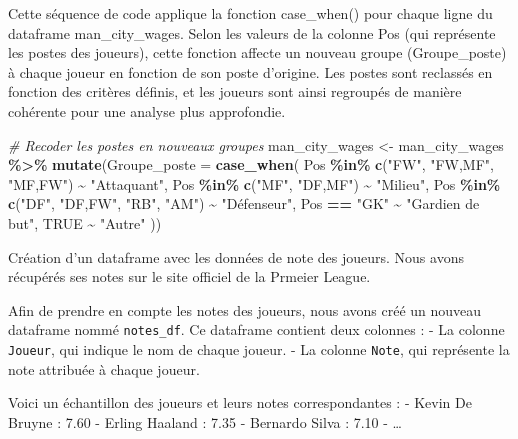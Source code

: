 \documentclass[
]{article}
\newenvironment{Shaded}{\begin{snugshade}}{\end{snugshade}}
\newcommand{\AttributeTok}[1]{\textcolor[rgb]{0.13,0.29,0.53}{#1}}
\newcommand{\CommentTok}[1]{\textcolor[rgb]{0.56,0.35,0.01}{\textit{#1}}}
\newcommand{\ConstantTok}[1]{\textcolor[rgb]{0.56,0.35,0.01}{#1}}
\newcommand{\FunctionTok}[1]{\textcolor[rgb]{0.13,0.29,0.53}{\textbf{#1}}}
\newcommand{\NormalTok}[1]{#1}
\newcommand{\OtherTok}[1]{\textcolor[rgb]{0.56,0.35,0.01}{#1}}
\newcommand{\SpecialCharTok}[1]{\textcolor[rgb]{0.81,0.36,0.00}{\textbf{#1}}}
\newcommand{\StringTok}[1]{\textcolor[rgb]{0.31,0.60,0.02}{#1}}
\begin{document}
Cette séquence de code applique la fonction case\_when() pour chaque
ligne du dataframe man\_city\_wages. Selon les valeurs de la colonne Pos
(qui représente les postes des joueurs), cette fonction affecte un
nouveau groupe (Groupe\_poste) à chaque joueur en fonction de son poste
d'origine. Les postes sont reclassés en fonction des critères définis,
et les joueurs sont ainsi regroupés de manière cohérente pour une
analyse plus approfondie.

\begin{Shaded}
\begin{Highlighting}[]
\CommentTok{\# Recoder les postes en nouveaux groupes}
\NormalTok{man\_city\_wages }\OtherTok{\textless{}{-}}\NormalTok{ man\_city\_wages }\SpecialCharTok{\%\textgreater{}\%}
  \FunctionTok{mutate}\NormalTok{(}\AttributeTok{Groupe\_poste =} \FunctionTok{case\_when}\NormalTok{(}
\NormalTok{    Pos }\SpecialCharTok{\%in\%} \FunctionTok{c}\NormalTok{(}\StringTok{"FW"}\NormalTok{, }\StringTok{"FW,MF"}\NormalTok{, }\StringTok{"MF,FW"}\NormalTok{) }\SpecialCharTok{\textasciitilde{}} \StringTok{"Attaquant"}\NormalTok{,}
\NormalTok{    Pos }\SpecialCharTok{\%in\%} \FunctionTok{c}\NormalTok{(}\StringTok{"MF"}\NormalTok{, }\StringTok{"DF,MF"}\NormalTok{) }\SpecialCharTok{\textasciitilde{}} \StringTok{"Milieu"}\NormalTok{,}
\NormalTok{    Pos }\SpecialCharTok{\%in\%} \FunctionTok{c}\NormalTok{(}\StringTok{"DF"}\NormalTok{, }\StringTok{"DF,FW"}\NormalTok{, }\StringTok{"RB"}\NormalTok{, }\StringTok{"AM"}\NormalTok{) }\SpecialCharTok{\textasciitilde{}} \StringTok{"Défenseur"}\NormalTok{,}
\NormalTok{    Pos }\SpecialCharTok{==} \StringTok{"GK"} \SpecialCharTok{\textasciitilde{}} \StringTok{"Gardien de but"}\NormalTok{,}
    \ConstantTok{TRUE} \SpecialCharTok{\textasciitilde{}} \StringTok{"Autre"}
\NormalTok{  ))}
\end{Highlighting}
\end{Shaded}

Création d'un dataframe avec les données de note des joueurs. Nous avons
récupérés ses notes sur le site officiel de la Prmeier League.

Afin de prendre en compte les notes des joueurs, nous avons créé un
nouveau dataframe nommé \texttt{notes\_df}. Ce dataframe contient deux
colonnes : - La colonne \texttt{Joueur}, qui indique le nom de chaque
joueur. - La colonne \texttt{Note}, qui représente la note attribuée à
chaque joueur.

Voici un échantillon des joueurs et leurs notes correspondantes : -
Kevin De Bruyne : 7.60 - Erling Haaland : 7.35 - Bernardo Silva : 7.10 -
\ldots{}
\end{document}
